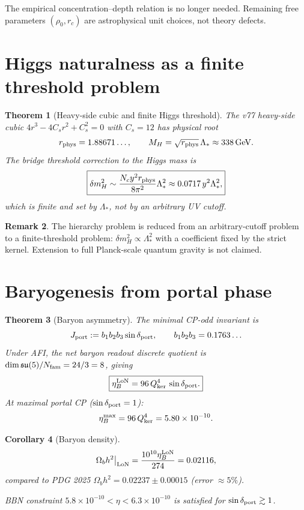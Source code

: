 \documentclass[12pt]{article}
\theoremstyle{plain}
\newtheorem{theorem}{Theorem}[section]
\newtheorem{corollary}[theorem]{Corollary}
\theoremstyle{definition}
\newtheorem{remark}[theorem]{Remark}
\numberwithin{equation}{section}
\newcommand{\kker}{\mathrm{ker}}
\begin{document}
The empirical concentration--depth relation is no longer needed.  Remaining free parameters $(\rho_0, r_c)$ are astrophysical unit choices, not theory defects.

\section{Higgs naturalness as a finite threshold problem}\label{sec:hierarchy}

\begin{theorem}[Heavy-side cubic and finite Higgs threshold]\label{thm:higgs}
The v77 heavy-side cubic $4r^3 - 4C_s r^2 + C_s^2 = 0$ with $C_s = 12$ has physical root
\[
r_{\rm phys} = 1.88671\ldots,\qquad M_H = \sqrt{r_{\rm phys}}\,\Lambda_* \approx 338\,\mathrm{GeV}.
\]
The bridge threshold correction to the Higgs mass is
\[
\boxed{\delta m_H^2 \sim \frac{N_c y^2 r_{\rm phys}}{8\pi^2}\Lambda_*^2 \approx 0.0717\,y^2\Lambda_*^2,}
\]
which is finite and set by $\Lambda_*$, not by an arbitrary UV cutoff.
\end{theorem}

\begin{remark}
The hierarchy problem is reduced from an arbitrary-cutoff problem to a finite-threshold problem: $\delta m_H^2 \propto \Lambda_*^2$ with a coefficient fixed by the strict kernel.  Extension to full Planck-scale quantum gravity is not claimed.
\end{remark}

\section{Baryogenesis from portal phase}\label{sec:baryogenesis}

\begin{theorem}[Baryon asymmetry]\label{thm:eta}
The minimal CP-odd invariant is
\[
J_{\rm port} := b_1 b_2 b_3 \sin\delta_{\rm port},\qquad b_1 b_2 b_3 = 0.1763\ldots
\]
Under AFI, the net baryon readout discrete quotient is $\dim\mathfrak{su}(5)/N_{\rm fam} = 24/3 = 8$, giving
\[
\boxed{\eta_B^{\rm LoN} = 96\,Q_\kker^4\,\sin\delta_{\rm port}.}
\]
At maximal portal CP ($\sin\delta_{\rm port}=1$):
\[
\eta_B^{\rm max} = 96\,Q_\kker^4 = 5.80\times10^{-10}.
\]
\end{theorem}

\begin{corollary}[Baryon density]
\[
\Omega_b h^2\big|_{\rm LoN} = \frac{10^{10}\eta_B^{\rm LoN}}{274} = 0.02116,
\]
compared to PDG 2025 $\Omega_b h^2 = 0.02237\pm0.00015$ (error $\approx5\%$).

BBN constraint $5.8\times10^{-10} < \eta < 6.3\times10^{-10}$ is satisfied for $\sin\delta_{\rm port} \gtrsim 1$.
\end{corollary}
\end{document}
